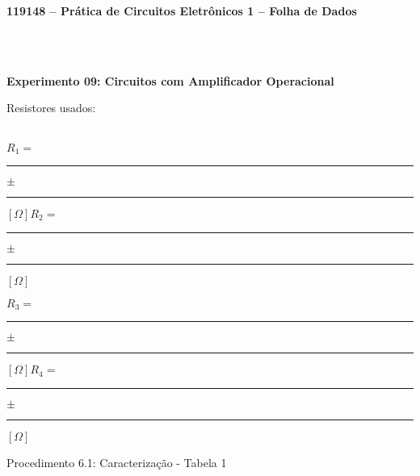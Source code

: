 \newpage
\begin{center}
    \Large \bfseries 119148 – Prática de Circuitos Eletrônicos 1 – Folha de Dados
\end{center}

\vspace{.5cm}

\setlength{\parindent}{0.0cm}

\\
\\

\vspace*{5mm}
\begin{center}
    \large \bfseries Experimento 09: Circuitos com Amplificador Operacional
\end{center}
\vspace{5mm}

Resistores usados:
\\
\\
\begin{center}
$R_{1}=$\enspace \rule{1.8cm}{.4pt}\enspace$\pm$\enspace\rule{1.8cm}{.4pt}\enspace$[\Omega]$\hspace{1cm}$R_{2}=$\enspace \rule{1.8cm}{.4pt}\enspace$\pm$\enspace \rule{1.8cm}{.4pt}\enspace$[\Omega]$
\par\end{center}
\begin{center}
$R_{3}=$\enspace \rule{1.8cm}{.4pt}\enspace$\pm$\enspace\rule{1.8cm}{.4pt}\enspace$[\Omega]$\hspace{1cm}$R_{4}=$\enspace\rule{1.8cm}{.4pt}\enspace$\pm$\enspace \rule{1.8cm}{.4pt}\enspace$[\Omega]$
\par\end{center}

\vspace{5mm}

\noindent Procedimento 6.1: Caracterização - Tabela 1

